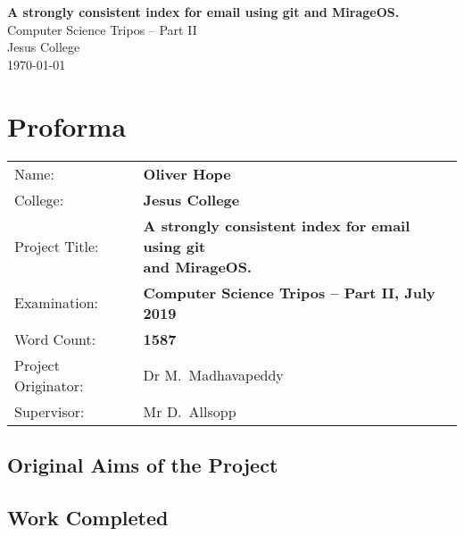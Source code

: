 \documentclass[12pt,a4paper,twoside,openright]{report}
\begin{document}





\pagestyle{empty}


\vspace*{60mm}
\begin{center}
\Huge
\textbf{A strongly consistent index for email using git and MirageOS.} \\[5mm]
Computer Science Tripos -- Part II \\[5mm]
Jesus College \\[5mm]
\today  %
\end{center}


\pagestyle{plain}

\chapter*{Proforma}

{\large
\begin{tabular}{ll}
Name:               & \bf Oliver Hope \\
College:            & \bf Jesus College \\
Project Title:      & \makecell[l]{\bf A strongly consistent index for email using git \\ \bf and MirageOS.} \\
Examination:        & \bf Computer Science Tripos -- Part II, July 2019 \\
Word Count:         & \bf 1587\footnotemark[1] \\
Project Originator: & Dr M.~Madhavapeddy \\
Supervisor:         & Mr D.~Allsopp \\
\end{tabular}
}


\section*{Original Aims of the Project}

\section*{Work Completed}
\end{document}
